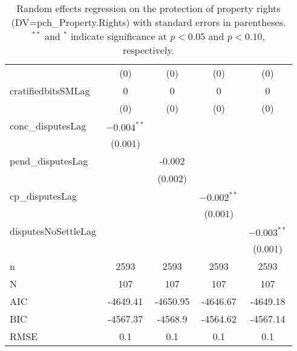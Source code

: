 \begin{table}[ht]
\begin{tabular}{lcccc}
   & (0) & (0) & (0) & (0) \\ 
  cratifiedbitsSMLag & 0 & 0 & 0 & 0 \\ 
   & (0) & (0) & (0) & (0) \\ 
  conc\_disputesLag & $-0.004^{\ast\ast}$ &  &  &  \\ 
   & (0.001) &  &  &  \\ 
  pend\_disputesLag &  & -0.002 &  &  \\ 
   &  & (0.002) &  &  \\ 
  cp\_disputesLag &  &  & $-0.002^{\ast\ast}$ &  \\ 
   &  &  & (0.001) &  \\ 
  disputesNoSettleLag &  &  &  & $-0.003^{\ast\ast}$ \\ 
   &  &  &  & (0.001) \\ 
   \hline
n & 2593 & 2593 & 2593 & 2593 \\ 
  N & 107 & 107 & 107 & 107 \\ 
  AIC & -4649.41 & -4650.95 & -4646.67 & -4649.18 \\ 
  BIC & -4567.37 & -4568.9 & -4564.62 & -4567.14 \\ 
  RMSE & 0.1 & 0.1 & 0.1 & 0.1 \\ 
   \hline
\hline
\end{tabular}
\caption{Random effects regression on the protection of property rights (DV=pch\_Property.Rights) with standard errors in parentheses. $^{**}$ and $^{*}$ indicate significance at $p< 0.05 $ and $p< 0.10 $, respectively.} 
\end{table}
